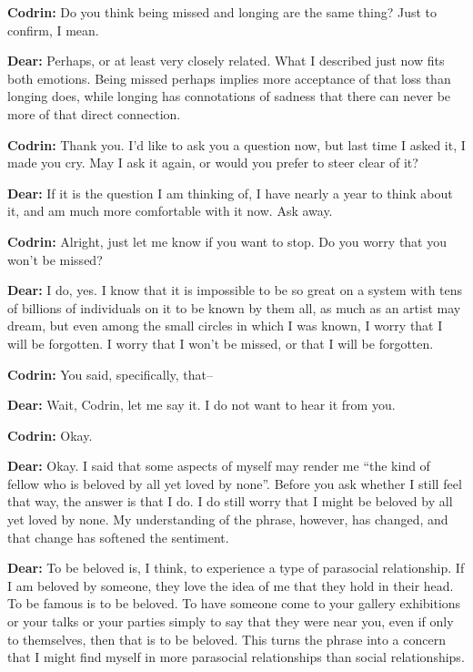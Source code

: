\textbf{Codrin:} Do you think being missed and longing are the same thing? Just to confirm, I mean.

\textbf{Dear:} Perhaps, or at least very closely related. What I described just now fits both emotions. Being missed perhaps implies more acceptance of that loss than longing does, while longing has connotations of sadness that there can never be more of that direct connection.

\textbf{Codrin:} Thank you. I'd like to ask you a question now, but last time I asked it, I made you cry. May I ask it again, or would you prefer to steer clear of it?

\textbf{Dear:} If it is the question I am thinking of, I have nearly a year to think about it, and am much more comfortable with it now. Ask away.

\textbf{Codrin:} Alright, just let me know if you want to stop. Do you worry that you won't be missed?

\textbf{Dear:} I do, yes. I know that it is impossible to be so great on a system with tens of billions of individuals on it to be known by them all, as much as an artist may dream, but even among the small circles in which I was known, I worry that I will be forgotten. I worry that I won't be missed, or that I will be forgotten.

\textbf{Codrin:} You said, specifically, that--

\textbf{Dear:} Wait, Codrin, let me say it. I do not want to hear it from you.

\textbf{Codrin:} Okay.

\textbf{Dear:} Okay. I said that some aspects of myself may render me ``the kind of fellow who is beloved by all yet loved by none''. Before you ask whether I still feel that way, the answer is that I do. I do still worry that I might be beloved by all yet loved by none. My understanding of the phrase, however, has changed, and that change has softened the sentiment.

\textbf{Dear:} To be beloved is, I think, to experience a type of parasocial relationship. If I am beloved by someone, they love the idea of me that they hold in their head. To be famous is to be beloved. To have someone come to your gallery exhibitions or your talks or your parties simply to say that they were near you, even if only to themselves, then that is to be beloved. This turns the phrase into a concern that I might find myself in more parasocial relationships than social relationships.

